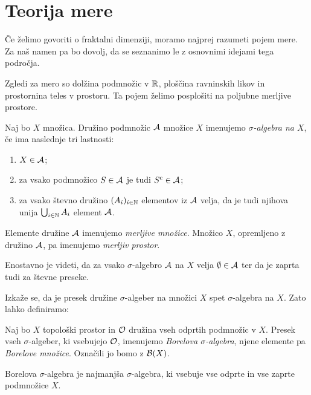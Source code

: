 \section{Teorija mere}
Če želimo govoriti o fraktalni dimenziji, moramo najprej razumeti pojem mere. 
Za naš namen pa bo dovolj, da se seznanimo le z osnovnimi idejami tega področja. 

Zgledi za mero so dolžina podmnožic v \(\mathbb{R}\), ploščina ravninskih likov in prostornina teles v prostoru. Ta pojem želimo posplošiti na poljubne merljive prostore.

\begin{definicija}
    Naj bo \(X\) množica. Družino podmnožic \(\mathcal{A}\) množice \(X\) imenujemo \emph{\(\sigma\)-algebra na \(X\)}, če ima naslednje tri lastnosti:
    \begin{enumerate}
        \item \(X \in \mathcal{A}\);
        \item za vsako podmnožico \(S \in \mathcal{A}\) je tudi \(S^{\text{c}} \in \mathcal{A}\);
        \item za vsako števno družino \((A_i)_{i \in \mathbb{N}}\) elementov iz \(\mathcal{A}\) velja, da je tudi njihova unija \(\bigcup_{i \in \mathbb{N}} A_i\) element \(\mathcal{A}\).
    \end{enumerate}
    Elemente družine \(\mathcal{A}\) imenujemo \emph{merljive množice}. Množico \(X\), opremljeno z družino \(\mathcal{A}\), pa imenujemo \emph{merljiv prostor}.
\end{definicija}

\begin{opomba}
    Enostavno je videti, da za vsako \(\sigma\)-algebro \(\mathcal{A}\) na \(X\) velja \(\emptyset \in \mathcal{A}\) ter da je zaprta tudi za števne preseke.
\end{opomba}

Izkaže se, da je presek družine \(\sigma\)-algeber na množici \(X\) spet \(\sigma\)-algebra na \(X\). Zato lahko definiramo:

\begin{definicija}
    Naj bo \(X\) topološki prostor in \(\mathcal{O}\) družina vseh odprtih podmnožic v \(X\). Presek vseh \(\sigma\)-algeber, ki vsebujejo \(\mathcal{O}\), imenujemo \emph{Borelova \(\sigma\)-algebra}, njene elemente pa \emph{Borelove množice}. Označili jo bomo z \(\mathcal{B}(X)\).
\end{definicija}

\begin{opomba}
    Borelova \(\sigma\)-algebra je najmanjša \(\sigma\)-algebra, ki vsebuje vse odprte in vse zaprte podmnožice \(X\).
\end{opomba}

